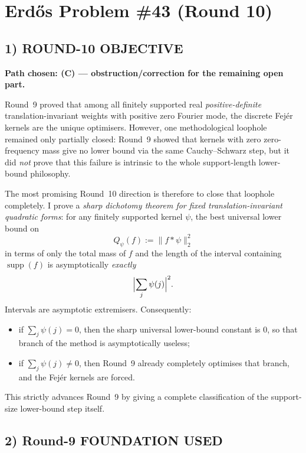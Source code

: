 \section{Erd\H{o}s Problem \#43 (Round 10)}

\subsection{1) ROUND-10 OBJECTIVE}

\textbf{Path chosen: (C) --- obstruction/correction for the remaining open part.}

Round~9 proved that among all finitely supported real \emph{positive-definite} translation-invariant weights with positive zero Fourier mode, the discrete Fej\'er kernels are the unique optimisers. However, one methodological loophole remained only partially closed: Round~9 showed that kernels with zero zero-frequency mass give no lower bound via the same Cauchy--Schwarz step, but it did \emph{not} prove that this failure is intrinsic to the whole support-length lower-bound philosophy.

The most promising Round~10 direction is therefore to close that loophole completely. I prove a \emph{sharp dichotomy theorem for fixed translation-invariant quadratic forms}: for any finitely supported kernel \(\psi\), the best universal lower bound on
\[
Q_\psi(f):=\|f*\psi\|_2^2
\]
in terms of only the total mass of \(f\) and the length of the interval containing \(\operatorname{supp}(f)\) is asymptotically \emph{exactly}
\[
\Bigl|\sum_j \psi(j)\Bigr|^2.
\]
Intervals are asymptotic extremisers. Consequently:
\begin{itemize}
\item if \(\sum_j\psi(j)=0\), then the sharp universal lower-bound constant is \(0\), so that branch of the method is asymptotically useless;
\item if \(\sum_j\psi(j)\neq 0\), then Round~9 already completely optimises that branch, and the Fej\'er kernels are forced.
\end{itemize}
This strictly advances Round~9 by giving a complete classification of the support-size lower-bound step itself.

\subsection{2) Round-9 FOUNDATION USED}

